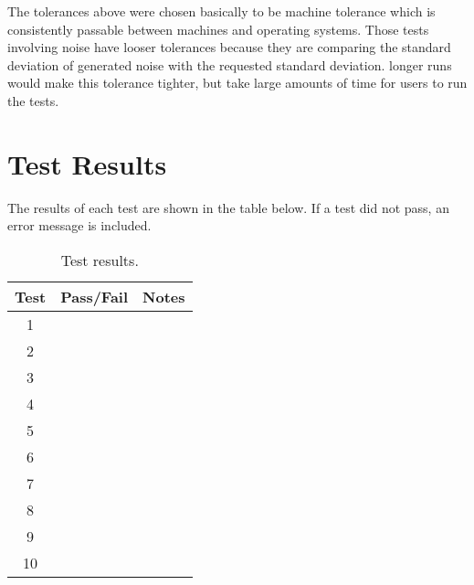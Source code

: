 The tolerances above were chosen basically to be machine tolerance which is consistently passable between machines and operating systems. Those tests involving noise have looser tolerances because they are comparing the standard deviation of generated noise with the requested standard deviation. longer runs would make this tolerance tighter, but take large amounts of time for users to run the tests.

\section{Test Results}
The results of each test are shown in the table below. If a test did not pass, an error message is included.

\begin{table}[H]
	\caption{Test results.}
	\label{tab:results}
	\centering \fontsize{10}{10}\selectfont
	\begin{tabular}{ c | c | c } %
		\hline
		\textbf{Test} & \textbf{Pass/Fail} 						   		    & \textbf{Notes} 									      \\ \hline
		1	   			  	&      	   & 	         \\ \hline
		2	   			  	&       & 	       \\ \hline
		3	   			  	&& 	 \\ \hline
		4	   			  	& & 	   \\ \hline
		5	   			  	&& 	 \\ \hline
		6	   			  	&      	  & 	              \\ \hline
		7	   			  	&    & 	      \\ \hline
		8	   			  	&      	& 	           \\ \hline
		9	   			  	&  & 	      \\ \hline
		10	   			  	& &\\ \hline
	
	\end{tabular}
\end{table}

